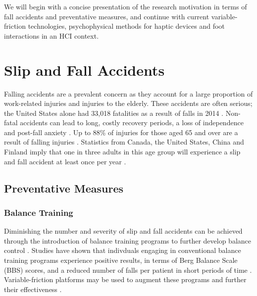 \documentclass [12pt,letterpaper]{report}
\begin{document}

We will begin with a concise presentation of the research motivation in terms of fall accidents and preventative measures, and continue with current variable-friction technologies, psychophysical methods for haptic devices and foot interactions in an HCI context.

\section{Slip and Fall Accidents}

Falling accidents are a prevalent concern as they account for a large proportion of work-related injuries and injuries to the elderly. These accidents are often serious; the United States alone had 33,018 fatalities as a result of falls in 2014  \cite{cdc2014deaths}. Non-fatal accidents can lead to long, costly recovery periods, a loss of independence and post-fall anxiety  \cite{chang2004interventions}. Up to 88\% of injuries for those aged 65 and over are a result of falling injuries  \cite{millet2016design}. Statistics from Canada, the United States, China and Finland imply that one in three adults in this age group will experience a slip and fall accident at least once per year \cite{millet2016design,chang2004interventions}.

\subsection{Preventative Measures}

\subsubsection{Balance Training}

Diminishing the number and severity of slip and fall accidents can be achieved through the introduction of balance training programs to further develop balance control \cite{millet2013vibration,millet2016design}. Studies have shown that indivduals engaging in conventional balance training programs experience positive results, in terms of Berg Balance Scale (BBS) scores, and a reduced number of falls per patient in short periods of time \cite{steadman2003randomized,madureira2007balance}. Variable-friction platforms may be used to augment these programs and further their effectiveness \cite{millet2011initial}.
\end{document}
